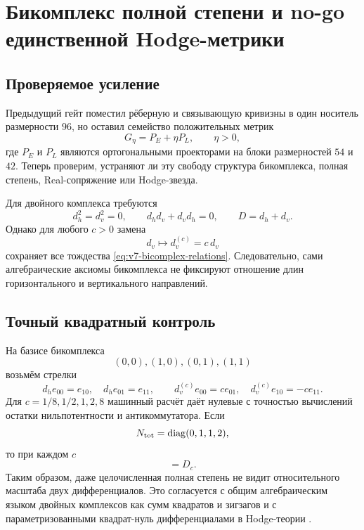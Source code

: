 \chapter{Бикомплекс полной степени и no-go единственной Hodge-метрики}
\label{ch:v7-bicomplex-total-degree-hodge-metric-gate}

\section{Проверяемое усиление}

Предыдущий гейт поместил рёберную и связывающую кривизны в один носитель
размерности $96$, но оставил семейство положительных метрик
\begin{equation}
 G_\eta=P_E+\eta P_L,
 \qquad \eta>0,
 \label{eq:v7-bicomplex-metric-family}
\end{equation}
где $P_E$ и $P_L$ являются ортогональными проекторами на блоки размерностей
$54$ и $42$. Теперь проверим, устраняют ли эту свободу структура
бикомплекса, полная степень, Real-сопряжение или Hodge-звезда.

Для двойного комплекса требуются
\begin{equation}
 d_h^2=d_v^2=0,
 \qquad d_hd_v+d_vd_h=0,
 \qquad D=d_h+d_v.
 \label{eq:v7-bicomplex-relations}
\end{equation}
Однако для любого $c>0$ замена
\begin{equation}
 d_v\longmapsto d_v^{(c)}=c\,d_v
 \label{eq:v7-bicomplex-vertical-rescaling}
\end{equation}
сохраняет все тождества \eqref{eq:v7-bicomplex-relations}.
Следовательно, сами алгебраические аксиомы бикомплекса не фиксируют
отношение длин горизонтального и вертикального направлений.

\section{Точный квадратный контроль}

На базисе бикомплекса
\begin{equation}
 (0,0),(1,0),(0,1),(1,1)
 \end{equation}
возьмём стрелки
\begin{equation}
 d_h e_{00}=e_{10},\quad d_h e_{01}=e_{11},\qquad
 d_v^{(c)}e_{00}=c e_{01},\quad d_v^{(c)}e_{10}=-c e_{11}.
 \label{eq:v7-bicomplex-square-control}
\end{equation}
Для $c=1/8,1/2,1,2,8$ машинный расчёт даёт нулевые с точностью вычислений
остатки нильпотентности и антикоммутатора. Если
\begin{equation}
 N_{\rm tot}=\operatorname{diag}(0,1,1,2),
 \end{equation}
то при каждом $c$
\begin{equation}
 [N_{\rm tot},D_c]=D_c.
 \label{eq:v7-bicomplex-total-degree}
\end{equation}
Таким образом, даже целочисленная полная степень не видит относительного
масштаба двух дифференциалов. Это согласуется с общим алгебраическим языком
двойных комплексов как сумм квадратов и зигзагов
\cite{v7-bicomplex-stelzig} и с параметризованными квадрат-нуль
дифференциалами в Hodge-теории \cite{v7-bicomplex-tardini-tomassini}.

